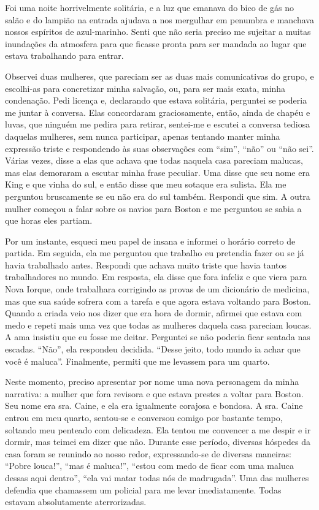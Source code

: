 Foi uma noite horrivelmente solitária, e a luz que emanava do bico de
gás no salão e do lampião na entrada ajudava a nos mergulhar em penumbra
e manchava nossos espíritos de azul-marinho. Senti que não seria preciso
me sujeitar a muitas inundações da atmosfera para que ficasse pronta
para ser mandada ao lugar que estava trabalhando para entrar.


Observei duas mulheres, que pareciam ser as duas mais comunicativas do grupo, e
escolhi-as para concretizar minha salvação, ou, para ser mais exata,
minha condenação. Pedi licença e, declarando que estava solitária,
perguntei se poderia me juntar à conversa. Elas concordaram
graciosamente, então, ainda de chapéu e luvas, que ninguém me pedira
para retirar, sentei-me e escutei a conversa tediosa daquelas mulheres,
sem nunca participar, apenas tentando manter minha expressão triste e
respondendo às suas observações com ``sim'', ``não'' ou ``não sei''.
Várias vezes, disse a elas que achava que todas naquela casa pareciam
malucas, mas elas demoraram a escutar minha frase peculiar. Uma disse
que seu nome era King e que vinha do sul, e então disse que meu sotaque
era sulista. Ela me perguntou bruscamente se eu não era do sul também.
Respondi que sim. A outra mulher começou a falar sobre os navios para
Boston e me perguntou se sabia a que horas eles partiam.

Por um instante, esqueci meu papel de insana e informei o horário
correto de partida. Em seguida, ela me perguntou que trabalho eu
pretendia fazer ou se já havia trabalhado antes. Respondi que achava
muito triste que havia tantos trabalhadores no mundo. Em resposta, ela
disse que fora infeliz e que viera para Nova Iorque, onde trabalhara
corrigindo as provas de um dicionário de medicina, mas que sua saúde
sofrera com a tarefa e que agora estava voltando para Boston. Quando a
criada veio nos dizer que era hora de dormir, afirmei que estava com
medo e repeti mais uma vez que todas as mulheres daquela casa pareciam
loucas. A ama insistiu que eu fosse me deitar. Perguntei se não poderia
ficar sentada nas escadas. ``Não'', ela respondeu decidida. 
``Desse jeito, todo mundo ia achar que você é maluca''. Finalmente,
permiti que me levassem para um quarto.

Neste momento, preciso apresentar por nome uma nova personagem da minha
narrativa: a mulher que fora revisora e que estava prestes a voltar para
Boston. Seu nome era sra. Caine, e ela era igualmente corajosa e
bondosa. A sra. Caine entrou em meu quarto, sentou-se e conversou comigo
por bastante tempo, soltando meu penteado com delicadeza. Ela tentou me
convencer a me despir e ir dormir, mas teimei em dizer que não. Durante
esse período, diversas hóspedes da casa foram se reunindo ao nosso
redor, expressando-se de diversas maneiras: ``Pobre louca!'', ``mas é
maluca!'', ``estou com medo de ficar com uma maluca dessas aqui dentro'',
``ela vai matar todas nós de madrugada''. Uma das mulheres defendia
que chamassem um policial para me levar imediatamente. Todas estavam
absolutamente aterrorizadas.

